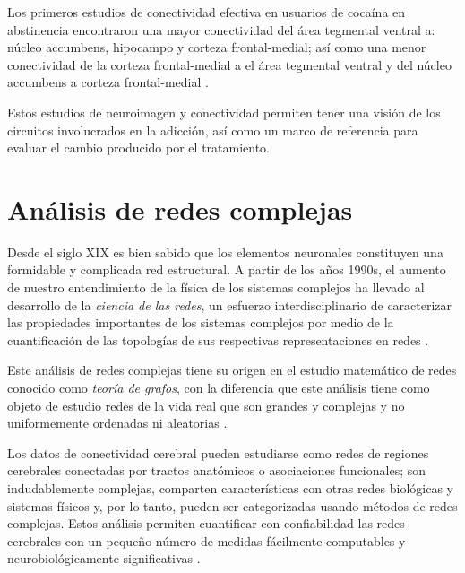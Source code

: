 Los primeros estudios de conectividad efectiva en usuarios de cocaína en abstinencia encontraron una mayor conectividad del área tegmental ventral a: núcleo accumbens, hipocampo y corteza frontal-medial; así como una menor conectividad de la corteza frontal-medial a el área tegmental ventral y del núcleo accumbens a corteza frontal-medial  \parencite{Ray2017,Ray2016}.\par
Estos estudios de neuroimagen y conectividad permiten tener una visión de los circuitos involucrados en la adicción, así como un marco de referencia para evaluar el cambio producido por el tratamiento.

\section{Análisis de redes complejas}
Desde el siglo XIX es bien sabido que los elementos neuronales constituyen una formidable y complicada red estructural.
A partir de los años 1990s, el aumento de nuestro entendimiento de la física de los sistemas complejos ha llevado al desarrollo de la \emph{ciencia de las redes}, un esfuerzo interdisciplinario de caracterizar las propiedades importantes de los sistemas complejos por medio de la cuantificación de las topologías de sus respectivas representaciones en redes \parencite{Bullmore2009a,Rubinov2010}.\par
Este análisis de redes complejas tiene su origen en el estudio matemático de redes conocido como \emph{teoría de grafos}, con la diferencia que este análisis tiene como objeto de estudio redes de la vida real que son grandes y complejas y no uniformemente ordenadas ni aleatorias \parencite{Rubinov2010}.\par
Los datos de conectividad cerebral pueden estudiarse como redes de regiones cerebrales conectadas por tractos anatómicos o asociaciones funcionales;
son indudablemente complejas, comparten características con otras redes biológicas y sistemas físicos y, por lo tanto, pueden ser categorizadas usando métodos de redes complejas.
Estos análisis permiten cuantificar con confiabilidad las redes cerebrales con un pequeño número de medidas fácilmente computables y neurobiológicamente significativas \parencite{Humphries2008,Latora2001,Achard2007}. \par

